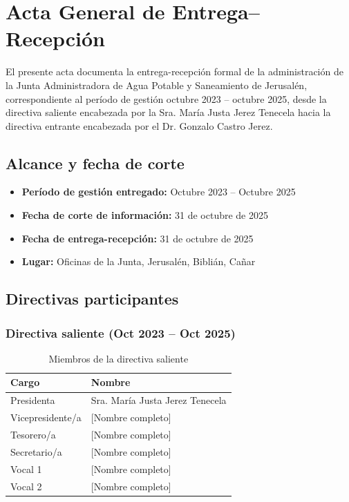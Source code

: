 \chapter{Acta General de Entrega--Recepción}

El presente acta documenta la entrega-recepción formal de la administración de la Junta Administradora de Agua Potable y Saneamiento de Jerusalén, correspondiente al período de gestión octubre 2023 -- octubre 2025, desde la directiva saliente encabezada por la Sra. María Justa Jerez Tenecela hacia la directiva entrante encabezada por el Dr. Gonzalo Castro Jerez.

\section*{Alcance y fecha de corte}

\begin{itemize}
  \item \textbf{Período de gestión entregado:} Octubre 2023 -- Octubre 2025
  \item \textbf{Fecha de corte de información:} 31 de octubre de 2025
  \item \textbf{Fecha de entrega-recepción:} 31 de octubre de 2025
  \item \textbf{Lugar:} Oficinas de la Junta, Jerusalén, Biblián, Cañar
\end{itemize}

\section*{Directivas participantes}

\subsection*{Directiva saliente (Oct 2023 -- Oct 2025)}

\begin{table}[H]
\centering
\caption{Miembros de la directiva saliente}
\label{tab:directiva-saliente}
\begin{tabularx}{\textwidth}{@{}lX@{}}
\toprule
\textbf{Cargo} & \textbf{Nombre} \\
\midrule
Presidenta & Sra. María Justa Jerez Tenecela \\
Vicepresidente/a & [Nombre completo] \\
Tesorero/a & [Nombre completo] \\
Secretario/a & [Nombre completo] \\
Vocal 1 & [Nombre completo] \\
Vocal 2 & [Nombre completo] \\
\bottomrule
\end{tabularx}
\end{table}


